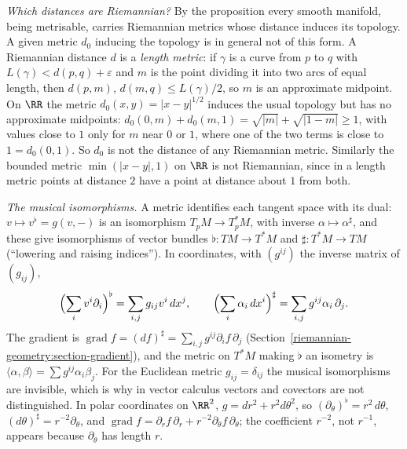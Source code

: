 \begin{remark}\label{riemannian-geometry:remark-which-metrics}
\emph{Which distances are Riemannian?} By the proposition every smooth manifold, being metrisable, carries Riemannian metrics whose distance induces its topology. A given metric $d_0$
inducing the topology is in general not of this form. A Riemannian distance $d$ is a \emph{length metric}: if $\gamma$ is a curve from $p$ to $q$ with $L(\gamma) < d(p, q) + \varepsilon$ and $m$ is the point
dividing it into two arcs of equal length, then $d(p, m)$, $d(m, q) \leq L(\gamma)/2$, so $m$ is an approximate midpoint. On $\RR$ the metric $d_0(x, y) = |x - y|^{1/2}$ induces the usual topology but has no
approximate midpoints: $d_0(0, m) + d_0(m, 1) = \sqrt{|m|} + \sqrt{|1 - m|} \geq 1$, with values close to $1$ only for $m$ near $0$ or $1$, where one of the two terms is close to $1 = d_0(0, 1)$. So $d_0$ is
not the distance of any Riemannian metric. Similarly the bounded metric $\min(|x - y|, 1)$ on $\RR$ is not Riemannian, since in a length metric points at distance $2$ have a point at distance about $1$ from
both.
\end{remark}

\begin{remark}\label{riemannian-geometry:remark-musical}
\emph{The musical isomorphisms.} A metric identifies each tangent space with its dual: $v \mapsto v^\flat = g(v, -)$ is an isomorphism $T_pM \to T_p^*M$, with inverse $\alpha \mapsto \alpha^\sharp$, and these
give isomorphisms of vector bundles $\flat \colon TM \to T^*M$ and $\sharp \colon T^*M \to TM$ (``lowering and raising indices''). In coordinates, with $(g^{ij})$ the inverse matrix of $(g_{ij})$,
\[
\Bigl(\sum_iv^i\partial_i\Bigr)^\flat = \sum_{i,j}g_{ij}v^i\,dx^j, \qquad \Bigl(\sum_i\alpha_i\,dx^i\Bigr)^\sharp = \sum_{i,j}g^{ij}\alpha_i\,\partial_j .
\]
The gradient is $\operatorname{grad}f = (df)^\sharp = \sum_{i,j}g^{ij}\partial_if\,\partial_j$ (Section~\ref{riemannian-geometry:section-gradient}), and the metric on $T^*M$ making $\flat$ an isometry is
$\langle\alpha, \beta\rangle = \sum g^{ij}\alpha_i\beta_j$. For the Euclidean metric $g_{ij} = \delta_{ij}$ the musical isomorphisms are invisible, which is why in vector calculus vectors and covectors are not
distinguished. In polar coordinates on $\RR^2$, $g = dr^2 + r^2d\theta^2$, so $(\partial_\theta)^\flat = r^2\,d\theta$, $(d\theta)^\sharp = r^{-2}\partial_\theta$, and
$\operatorname{grad}f = \partial_rf\,\partial_r + r^{-2}\partial_\theta f\,\partial_\theta$; the coefficient $r^{-2}$, not $r^{-1}$, appears because $\partial_\theta$ has length $r$.
\end{remark}

